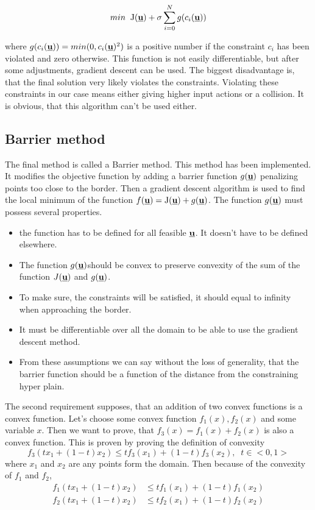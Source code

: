 \documentclass[a4paper,11pt,titlepage]{article}
\newcommand{\uvec}{\textbf{\underline{u}}}
\newcommand{\macf}{f(\uvec)}
\begin{document}
\begin{equation}
min\;\;\mathrm{J}(\uvec) + \sigma\sum_{i = 0}^N g(c_i(\uvec))
\end{equation}

where $g(c_i(\uvec)) = min(0, c_i(\uvec)^2)$ is a positive number if the constraint $c_i$ has been violated and zero otherwise. This function is not easily differentiable, but after some adjustments, gradient descent can be used. The biggest disadvantage is, that the final solution very likely violates the constraints. Violating these constraints in our case means either giving higher input actions or a collision. It is obvious, that this algorithm can't be used either.  

\subsection{Barrier method}
The final method is called a Barrier method. This method has been implemented. It modifies the objective function by adding a barrier function $g(\uvec)$ penalizing points too close to the border. Then a gradient descent algorithm is used to find the local minimum of the function $\macf = \mathrm{J}(\uvec) + g(\uvec)$. The function $g(\uvec)$ must possess several properties. 

\begin{itemize}
\item the function has to be defined for all feasible $\uvec$. It doesn't have to be defined elsewhere.
\item The function $g(\uvec)$should be convex to preserve convexity of the sum of the function $J(\uvec)$ and $g(\uvec)$.
\item  To make sure, the constraints will be satisfied, it should equal to infinity when approaching the border.
\item It must be differentiable over all the domain to be able to use the gradient descent method.
\item From these assumptions we can say without the loss of generality, that the barrier function should be a function of the distance from the constraining hyper plain.
\end{itemize}

The second requirement supposes, that an addition of two convex functions is a convex function. Let's choose some convex function $f_1(x), f_2(x)$ and some variable $x$. Then we want to prove, that $f_3(x) = f_1(x) + f_2(x)$ is also a convex function. This is proven by proving the definition of convexity 
\begin{equation}
\label{eq:sum_conv_def}
f_3(tx_1+(1-t)x_2) \leq tf_3(x_1) + (1-t)f_3(x_2), \;\; t  \in  <0, 1>
\end{equation}
where $x_1$ and $x_2$ are any points form the domain. Then because of the convexity of $f_1$ and $f_2$,
\begin{equation}
\label{eq:sum_conv_1}
\begin{split}
f_1(tx_1+(1-t)x_2) &\leq tf_1(x_1) + (1-t)f_1(x_2)\\
f_2(tx_1+(1-t)x_2) &\leq tf_2(x_1) + (1-t)f_2(x_2)\\
\end{split}
\end{equation}
\end{document}
